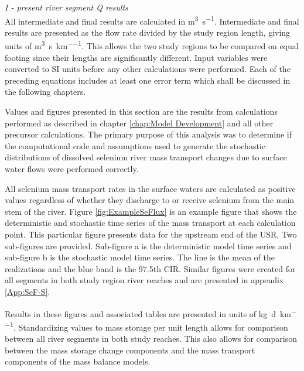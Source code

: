 \begin{linenumbers}
\emph{I - present river segment Q results}\\

All intermediate and final results are calculated in \si{\cubic\meter\per\second}.  Intermediate and final results are presented as the flow rate divided by the study region length, giving units of \si{\cubic\meter\per\second\per\kilo\meter}.  This allows the two study regions to be compared on equal footing since their lengths are significantly different.  Input variables were converted to SI units before any other calculations were performed.  Each of the preceding equations includes at least one error term which shall be discussed in the following chapters.

Values and figures presented in this section are the results from calculations performed as described in chapter \ref{chap:Model Development} and all other precursor calculations.  The primary purpose of this analysis was to determine if the computational code and assumptions used to generate the stochastic distributions of dissolved selenium river mass transport changes due to surface water flows were performed correctly.

All selenium mass transport rates in the surface waters are calculated as positive values regardless of whether they discharge to or receive selenium from the main stem of the river.  Figure \ref{fig:ExampleSeFlux} is an example figure that shows the deterministic and stochastic time series of the mass transport at each calculation point.  This particular figure presents data for the upstream end of the USR.  Two sub-figures are provided.  Sub-figure a is the deterministic model time series and sub-figure b is the stochastic model time series.  The line is the mean of the realizations and the blue band is the 97.5th CIR.  Similar figures were created for all segments in both study region river reaches and are presented in appendix \ref{App:SeF-S}.

Results in these figures and associated tables are presented in units of \si{\kilo\gram\per\day\per\kilo\meter}.  Standardizing values to mass storage per unit length allows for comparison between all river segments in both study reaches.  This also allows for comparison between the mass storage change components and the mass transport components of the mass balance models.


\end{linenumbers}
